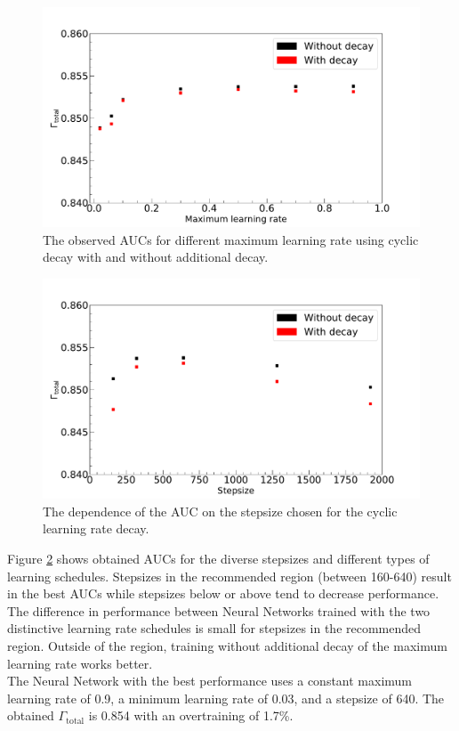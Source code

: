 \begin{figure}[H]
\centering
\includegraphics[width=0.95\linewidth]{figs/FNN/MaxAuc_Fixed}
\caption{The observed AUCs for different maximum learning rate using cyclic decay with and without additional decay.}
\label{fig:CylicLr}
\end{figure}

\begin{figure}[H]
\centering
\includegraphics[width=0.95\linewidth]{figs/FNN/StepAuc_Fixed}
\caption{The dependence of the AUC on the stepsize chosen for the cyclic learning rate decay.}
\label{fig:CylicStepSize}
\end{figure}

Figure \ref{fig:CylicStepSize} shows obtained AUCs for the diverse stepsizes and different types of learning schedules. Stepsizes in the recommended region (between 160-640) result in the best AUCs while stepsizes below or above tend to decrease performance. The difference in performance between Neural Networks trained with the two distinctive learning rate schedules is small for stepsizes in the recommended region. Outside of the region, training without additional decay of the maximum learning rate works better. \\
The Neural Network with the best performance uses a constant maximum learning rate of 0.9, a minimum learning rate of 0.03, and a stepsize of 640. The obtained $\Gamma_{\text{total}}$ is 0.854 with an overtraining of 1.7\%.


